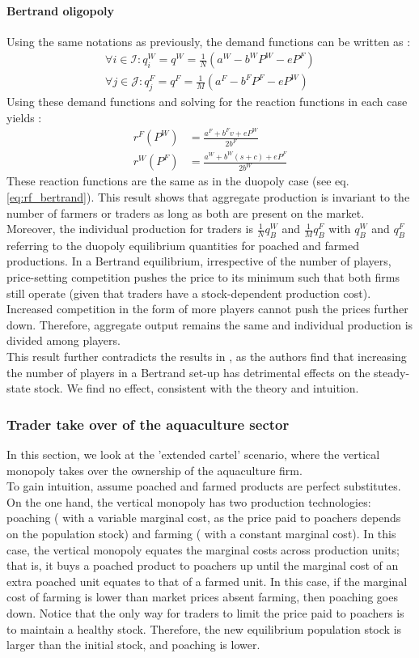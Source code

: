 \paragraph{Bertrand oligopoly}
Using the same notations as previously, the demand functions can be written as : 
\begin{align}
    \forall i\in \mathcal{I} : q^W_i = q^W = \frac{1}{N}(a^W - b^W P^W - e P^F)\\
    \forall j \in \mathcal{J} : q^F_j = q^F = \frac{1}{M}(a^F - b^F P^F - e P^W)
\end{align}
Using these demand functions and solving for the reaction functions in each case yields : 
\begin{align}
    r^F(P^W) &= \frac{a^F + b^F v + eP^W}{2b^F}\\
    r^W(P^F) &= \frac{a^W + b^W (s+c) + e P^F}{2b^W}
\end{align}
These reaction functions are the same as in the duopoly case (see eq. \ref{eq:rf_bertrand}). This result shows that aggregate production is invariant to the number of farmers or traders as long as both are present on the market. Moreover, the individual production for traders is $\frac{1}{N} q^W_B$ and $\frac{1}{M}q^F_B$ with $q^W_B$ and $q^F_B$ referring to the duopoly equilibrium quantities for poached and farmed productions. In a Bertrand equilibrium, irrespective of the number of players, price-setting competition pushes the price to its minimum such that both firms still operate (given that traders have a stock-dependent production cost). Increased competition in the form of more players cannot push the prices further down. Therefore, aggregate output remains the same and individual production is divided among players. \\
This result further contradicts the results in \cite{damania_economics_2007}, as the authors find that increasing the number of players in a Bertrand set-up has detrimental effects on the steady-state stock. We find no effect, consistent with the theory and intuition. 
%
\subsubsection{Trader take over of the aquaculture sector}
%
In this section, we look at the 'extended cartel' scenario, where the vertical monopoly takes over the ownership of the aquaculture firm. \\
To gain intuition, assume poached and farmed products are perfect substitutes. On the one hand, the vertical monopoly has two production technologies:  poaching ( with a variable marginal cost, as the price paid to poachers depends on the population stock) and farming ( with a constant marginal cost). In this case, the vertical monopoly equates the marginal costs across production units; that is, it buys a poached product to poachers up until the marginal cost of an extra poached unit equates to that of a farmed unit. In this case, if the marginal cost of farming is lower than market prices absent farming, then poaching goes down. Notice that the only way for traders to limit the price paid to poachers is to maintain a healthy stock. Therefore, the new equilibrium population stock is larger than the initial stock, and poaching is lower.

